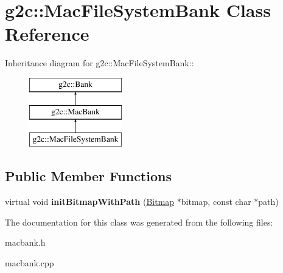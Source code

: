 \hypertarget{classg2c_1_1_mac_file_system_bank}{
\section{g2c::MacFileSystemBank Class Reference}
\label{classg2c_1_1_mac_file_system_bank}
}
Inheritance diagram for g2c::MacFileSystemBank::\begin{figure}[H]
\begin{center}
\leavevmode
\includegraphics[height=3cm]{classg2c_1_1_mac_file_system_bank}
\end{center}
\end{figure}
\subsection*{Public Member Functions}
\begin{DoxyCompactItemize}
\item 
\hypertarget{classg2c_1_1_mac_file_system_bank_ae55938e2b57d7e89dae2e158aecf66c2}{
virtual void {\bfseries initBitmapWithPath} (\hyperlink{classg2c_1_1_bitmap}{Bitmap} $\ast$bitmap, const char $\ast$path)}
\label{classg2c_1_1_mac_file_system_bank_ae55938e2b57d7e89dae2e158aecf66c2}

\end{DoxyCompactItemize}


The documentation for this class was generated from the following files:\begin{DoxyCompactItemize}
\item 
macbank.h\item 
macbank.cpp\end{DoxyCompactItemize}
